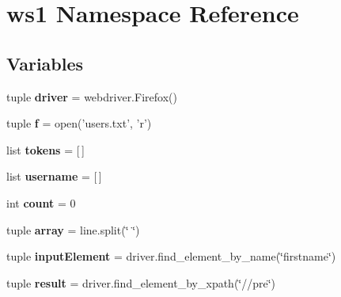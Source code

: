\hypertarget{namespacews1}{\section{ws1 Namespace Reference}
\label{namespacews1}
}
\subsection*{Variables}
\begin{DoxyCompactItemize}
\item 
\hypertarget{namespacews1_a0c001da13426a4a4fbc65939f2721338}{tuple {\bfseries driver} = webdriver.\+Firefox()}\label{namespacews1_a0c001da13426a4a4fbc65939f2721338}

\item 
\hypertarget{namespacews1_a85d897846bb64fe74a8ce36c2365e3b8}{tuple {\bfseries f} = open('users.\+txt', 'r')}\label{namespacews1_a85d897846bb64fe74a8ce36c2365e3b8}

\item 
\hypertarget{namespacews1_a9d8fc0a8a32a495bffe2f3e66a13ab8e}{list {\bfseries tokens} = \mbox{[}$\,$\mbox{]}}\label{namespacews1_a9d8fc0a8a32a495bffe2f3e66a13ab8e}

\item 
\hypertarget{namespacews1_ac07862cea23cd71644827eee8c3622e6}{list {\bfseries username} = \mbox{[}$\,$\mbox{]}}\label{namespacews1_ac07862cea23cd71644827eee8c3622e6}

\item 
\hypertarget{namespacews1_ad43c3812e6d13e0518d9f8b8f463ffcf}{int {\bfseries count} = 0}\label{namespacews1_ad43c3812e6d13e0518d9f8b8f463ffcf}

\item 
\hypertarget{namespacews1_ace64da0433dda1cd511da4909831ff15}{tuple {\bfseries array} = line.\+split(\char`\"{} \char`\"{})}\label{namespacews1_ace64da0433dda1cd511da4909831ff15}

\item 
\hypertarget{namespacews1_a32ad4010f9e79f7b23a7e170ac7a800c}{tuple {\bfseries input\+Element} = driver.\+find\+\_\+element\+\_\+by\+\_\+name(\char`\"{}firstname\char`\"{})}\label{namespacews1_a32ad4010f9e79f7b23a7e170ac7a800c}

\item 
\hypertarget{namespacews1_a14268f4ce59d718e0395d95e88b37e29}{tuple {\bfseries result} = driver.\+find\+\_\+element\+\_\+by\+\_\+xpath(\char`\"{}//pre\char`\"{})}\label{namespacews1_a14268f4ce59d718e0395d95e88b37e29}


\end{DoxyCompactItemize}
